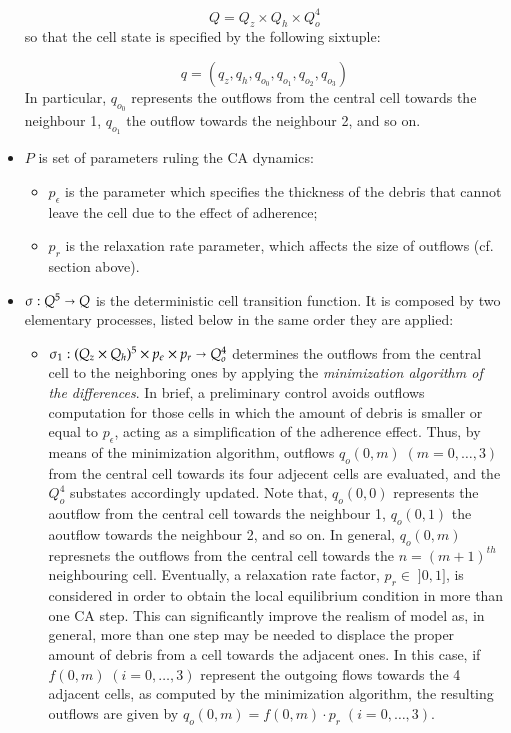 \begin{itemize}
$$Q = Q_z \times Q_h \times Q_o^4$$
so that the cell state is specified by the following sixtuple:

$$ q = (q_z, q_h, q_{o_0}, q_{o_1}, q_{o_2}, q_{o_3})$$
In particular, $q_{o_0}$ represents the outflows from the central cell towards the neighbour 1, $q_{o_1}$ the outflow towards the neighbour 2, and so on.

\item   $P$ is set of parameters ruling the CA dynamics:

\begin{itemize}
    \item   $p_\epsilon$ is the parameter which specifies the thickness of the debris that cannot leave the cell due to the effect of adherence;
    \item   $p_r$ is the relaxation rate parameter, which affects the size of outflows (cf. section above).
\end{itemize}

\item $\sigma : Q^5 \shortrightarrow Q$ is the deterministic cell
  transition function. It is composed by two elementary processes,
  listed below in the same order they are applied:
\begin{itemize}
\item $\sigma_1 : (Q_z \times Q_h)^5 \times p_\epsilon \times
  p_r\shortrightarrow Q_o^4$ determines the outflows from the central
  cell to the neighboring ones by applying the \emph{minimization
    algorithm of the differences}. In brief, a preliminary control
  avoids outflows computation for those cells in which the amount of
  debris is smaller or equal to $p_\epsilon$, acting as a
  simplification of the adherence effect. Thus, by means of the
  minimization algorithm, outflows $q_o(0,m) \; (m=0,\ldots,3)$ from
  the central cell towards its four adjecent cells are evaluated, and
  the $Q_o^4$ substates accordingly updated. Note that, $q_o(0,0)$
  represents the aoutflow from the central cell towards the neighbour
  1, $q_o(0,1)$ the aoutflow towards the neighbour 2, and so on. In
  general, $q_o(0,m)$ represnets the outflows from the central cell
  towards the $n=(m+1)^{th}$ neighbouring cell. Eventually, a
  relaxation rate factor, $p_r \in \; ]0,1]$, is considered in order
      to obtain the local equilibrium condition in more than one CA
      step. This can significantly improve the realism of model as, in
      general, more than one step may be needed to displace the proper
      amount of debris from a cell towards the adjacent ones. In this
      case, if $f(0,m) \; (i=0, \ldots, 3)$ represent the outgoing
      flows towards the 4 adjacent cells, as computed by the
      minimization algorithm, the resulting outflows are given by
      $q_o(0,m)=f(0,m) \cdot p_r \; (i=0, \ldots, 3)$.


\end{itemize}
\end{itemize}
